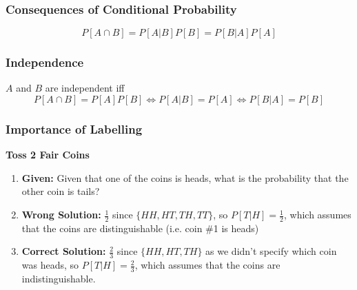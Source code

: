 \subsubsection{Consequences of Conditional Probability}
\begin{definition}
    \begin{equation}
        P[A \cap B] = P[A|B]P[B] = P[B|A]P[A]
    \end{equation}
\end{definition}

\subsubsection{Independence}
\begin{definition}
    $A$ and $B$ are independent iff 
    \begin{equation}
        P[A \cap B] = P[A]P[B] \iff P[A|B] = P[A] \iff P[B|A] = P[B]
    \end{equation}
\end{definition}

\subsubsection{Importance of Labelling}
\begin{example} \textbf{Toss 2 Fair Coins}
    \begin{enumerate}
        \item \textbf{Given:} Given that one of the coins is heads, what is the probability that the other coin is tails?
        \item \textbf{Wrong Solution:} $\frac{1}{2}$ since $\{HH, HT, TH, TT\}$, so $P[T|H] = \frac{1}{2}$, which assumes that the coins are distinguishable (i.e. coin \#1 is heads)
        \item \textbf{Correct Solution:} $\frac{2}{3}$ since $\{HH, HT, TH\}$ as we didn't specify which coin was heads, so $P[T|H] = \frac{2}{3}$, which assumes that the coins are indistinguishable.
    \end{enumerate}
    
\end{example}


